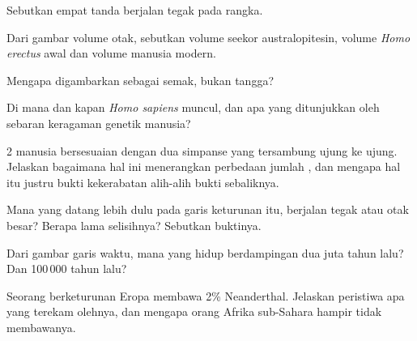\begin{exercise}[$\star$]\label{exo:g12:human-evolution:2}
Sebutkan empat tanda berjalan tegak pada rangka.
\end{exercise}

\begin{exercise}[$\star$]\label{exo:g12:human-evolution:3}
Dari gambar volume otak, sebutkan volume seekor australopitesin,
volume \emph{Homo erectus} awal dan volume manusia modern.
\end{exercise}

\begin{exercise}[$\star$]\label{exo:g12:human-evolution:4}
Mengapa  digambarkan sebagai semak, bukan tangga?
\end{exercise}

\begin{exercise}[$\star$]\label{exo:g12:human-evolution:5}
Di mana dan kapan \emph{Homo sapiens} muncul, dan apa yang ditunjukkan
oleh sebaran keragaman genetik manusia?
\end{exercise}

\begin{exercise}[$\star\star$]\label{exo:g12:human-evolution:6}
 2 manusia bersesuaian dengan dua  simpanse yang
tersambung ujung ke ujung. Jelaskan bagaimana hal ini menerangkan
perbedaan jumlah , dan mengapa hal itu justru bukti
kekerabatan alih-alih bukti sebaliknya.
\end{exercise}

\begin{exercise}[$\star\star$]\label{exo:g12:human-evolution:7}
Mana yang datang lebih dulu pada garis keturunan itu, berjalan tegak
atau otak besar? Berapa lama selisihnya? Sebutkan buktinya.
\end{exercise}

\begin{exercise}[$\star\star$]\label{exo:g12:human-evolution:8}
Dari gambar garis waktu,  mana yang hidup berdampingan dua juta
tahun lalu? Dan 100\,000 tahun lalu?
\end{exercise}

\begin{exercise}[$\star\star$]\label{exo:g12:human-evolution:9}
Seorang berketurunan Eropa membawa 2\%  Neanderthal. Jelaskan
peristiwa apa yang terekam olehnya, dan mengapa orang Afrika
sub-Sahara hampir tidak membawanya.
\end{exercise}

